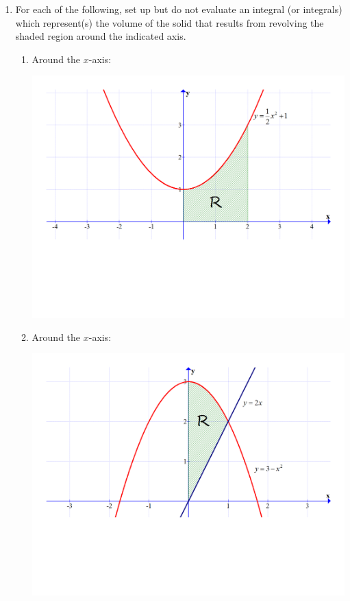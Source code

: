 \documentclass[12pt]{article}
\newif\ifans
\begin{document}
\begin{enumerate}

\item For each of the following, set up but do not evaluate an integral (or integrals) which represent(s) the volume of the solid that results from revolving the shaded region around the indicated axis.

\begin{enumerate}

\item Around the $x$-axis:

\begin{center}

\includegraphics[scale=0.5]{graph1.pdf}

\end{center}

\ifans{\fbox{$\pi\int_0^2 \left(\frac{1}{2}x^2+1\right)^2 \,dx$}} \fi

\newpage

\item Around the $x$-axis:

\begin{center}

\includegraphics[scale=0.3]{graph2.pdf}


\end{center}
\end{enumerate}
\end{enumerate}
\end{document}
